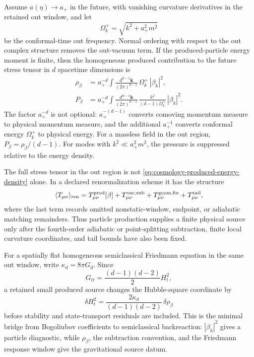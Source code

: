 \begin{controlledapproximation}
\label{ca:cosmology-out-produced-stress-tensor}
Assume \(a(\eta)\to a_+\) in the future, with vanishing curvature derivatives
in the retained out window, and let
\begin{equation}
  \Omega_k^+=\sqrt{k^2+a_+^2m^2}
  \label{eq:cosmology-out-frequency}
\end{equation}
be the conformal-time out frequency.  Normal ordering with respect to the
out complex structure removes the out-vacuum term.  If the produced-particle
energy moment is finite, then the homogeneous produced contribution to the
future stress tensor in \(d\) spacetime dimensions is
\begin{align}
  \rho_\beta
  &=
  a_+^{-d}
  \int
  \frac{d^{d-1}\mathbf k}{(2\pi)^{d-1}}\,
  \Omega_k^+\,|\beta_k|^2,
  \label{eq:cosmology-produced-energy-density}
  \\
  P_\beta
  &=
  a_+^{-d}
  \int
  \frac{d^{d-1}\mathbf k}{(2\pi)^{d-1}}\,
  \frac{k^2}{(d-1)\Omega_k^+}\,|\beta_k|^2 .
  \label{eq:cosmology-produced-pressure}
\end{align}
The factor \(a_+^{-d}\) is not optional: \(a_+^{-(d-1)}\) converts comoving
momentum measure to physical momentum measure, and the additional \(a_+^{-1}\)
converts conformal energy \(\Omega_k^+\) to physical energy.  For a massless
field in the out region, \(P_\beta=\rho_\beta/(d-1)\).  For modes with
\(k^2\ll a_+^2m^2\), the pressure is suppressed relative to the energy
density.

The full stress tensor in the out region is not
\eqref{eq:cosmology-produced-energy-density} alone.  In a declared
renormalization scheme it has the structure
\begin{equation}
  \langle T_{\mu\nu}\rangle_{\rm ren}
  =
  T_{\mu\nu}^{\rm prod}[\beta]
  +
  T_{\mu\nu}^{\rm vac,sub}
  +
  T_{\mu\nu}^{\rm geom,fin}
  +
  T_{\mu\nu}^{\rm tail},
  \label{eq:cosmology-stress-produced-decomposition}
\end{equation}
where the last term records omitted nonstatic-window, endpoint, or adiabatic
matching remainders.  Thus particle production supplies a finite physical
source only after the fourth-order adiabatic or point-splitting subtraction,
finite local curvature coordinates, and tail bounds have also been fixed.

For a spatially flat homogeneous semiclassical Friedmann equation in the same
out window, write \(\kappa_d=8\pi G_d\).  Since
\[
  G_{tt}=\frac{(d-1)(d-2)}2 H_t^2 ,
\]
a retained small produced source changes the Hubble-square coordinate by
\begin{equation}
  \delta H_t^2
  =
  \frac{2\kappa_d}{(d-1)(d-2)}\,\delta\rho_\beta
  \label{eq:cosmology-produced-friedmann-response}
\end{equation}
before stability and state-transport residuals are included.  This is the
minimal bridge from Bogoliubov coefficients to semiclassical backreaction:
\(|\beta_k|^2\) gives a particle diagnostic, while
\(\rho_\beta\), the subtraction convention, and the Friedmann response window
give the gravitational source datum.
\end{controlledapproximation}

